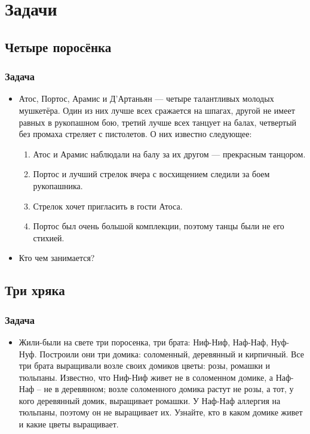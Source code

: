 \documentclass[compress,red]{beamer}
\begin{document}
\section{Задачи}
\subsection{Четыре поросёнка}
\begin{frame}[fragile]
  \frametitle{Задача}
  \begin{itemize}
    \item Атос, Портос, Арамис и Д’Артаньян --- четыре талантливых молодых мушкетёра. Один из них лучше всех сражается на шпагах, другой не имеет равных в рукопашном бою, третий лучше всех танцует на балах, четвертый без промаха стреляет с пистолетов. О них известно следующее: 
    \begin{enumerate}
      \item Атос и Арамис наблюдали на балу за их другом --- прекрасным танцором. 
      \item Портос и лучший стрелок вчера с восхищением следили за боем рукопашника.
      \item Стрелок хочет пригласить в гости Атоса.
      \item Портос был очень большой комплекции, поэтому танцы были не его стихией.
    \end{enumerate}
    \item Кто чем занимается?
  \end{itemize}
\end{frame}

\subsection{Три хряка}
\begin{frame}[fragile]
  \frametitle{Задача}
  \begin{itemize}
    \item Жили-были на свете три поросенка, три брата: Ниф-Ниф, Наф-Наф, Нуф-Нуф. Построили они три домика: соломенный, деревянный и кирпичный. Все три брата выращивали возле своих домиков цветы: розы, ромашки и тюльпаны. Известно, что Ниф-Ниф живет не в соломенном домике, а Наф-Наф – не в деревянном; возле соломенного домика растут не розы, а тот, у кого деревянный домик, выращивает ромашки. У Наф-Наф аллергия на тюльпаны, поэтому он не выращивает их. Узнайте, кто в каком домике живет и какие цветы выращивает. 
  \end{itemize}
\end{frame}
\end{document}
